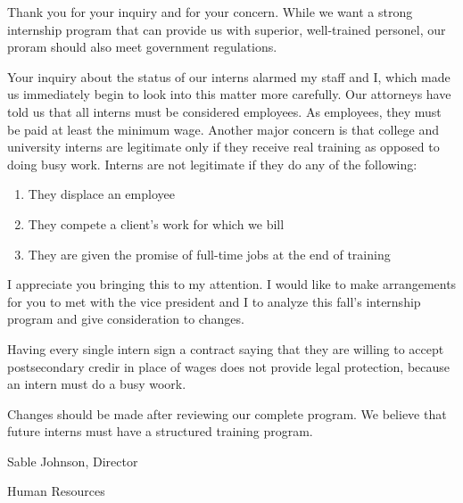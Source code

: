 \documentclass[letterpaper]{article}
\begin{document}
Thank you for your inquiry and for your concern. While we want a
strong internship program that can provide us with superior, well-trained
personel, our proram should also meet government regulations.

Your inquiry about the status of our interns alarmed my staff and I, which made us
immediately begin to look into this matter more carefully. Our attorneys
have told us that all interns must be considered employees.
As employees, they must be paid at least the minimum wage.
Another major concern is that college and university interns
are legitimate only if they receive real training as opposed to
doing busy work.
Interns are not legitimate if they do any of the following:
\begin{enumerate}
  \item They displace an employee
  \item They compete a client's work for which we bill
  \item They are given the promise of full-time jobs at the end of training
\end{enumerate}

\par
I appreciate you bringing this to my attention. I would like to make
arrangements for you to met with the vice president and I to analyze
this fall's internship program and give consideration to changes.

Having every single intern sign a contract saying that they are willing
to accept postsecondary credir in place of wages does not provide
legal protection, because an intern must do a busy woork.


Changes should be made after reviewing our complete program. We believe that future
interns must have a structured training program.

\vspace{1cm}
Sable Johnson, Director

\vspace{.5cm}
Human Resources
\end{document}
